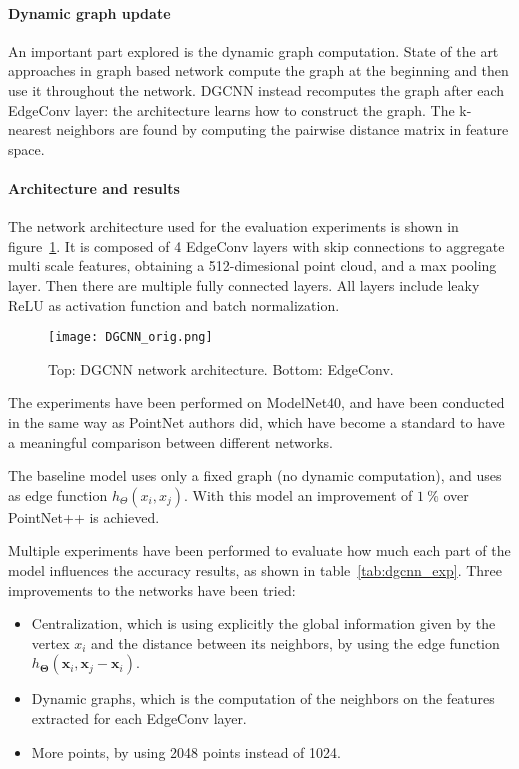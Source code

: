 \paragraph{Dynamic graph update}
An important part explored is the dynamic graph computation.
State of the art approaches in graph based network compute the graph at the beginning and then use it throughout the network. DGCNN instead recomputes the graph after each EdgeConv layer: the architecture learns how to construct the graph.
The k-nearest neighbors are found by computing the pairwise distance matrix in feature space.

\paragraph{Architecture and results}

The network architecture used for the evaluation experiments is shown in figure~\ref{fig:DGCNN}. It is composed of 4 EdgeConv layers with skip connections to aggregate multi scale features, obtaining a 512-dimesional point cloud, and a max pooling layer. Then there are multiple fully connected layers. All layers include leaky ReLU as activation function and batch normalization.

\begin{figure}[ht]
    \centering
    \texttt{[image: DGCNN\_orig.png]}
    \caption{Top: DGCNN network architecture. Bottom: EdgeConv.~\cite{Wang2019}}
    \label{fig:DGCNN}
\end{figure}

The experiments have been performed on ModelNet40, and have been conducted in the same way as PointNet authors did, which have become a standard to have a meaningful comparison between different networks.

The baseline model uses only a fixed graph (no dynamic computation), and uses as edge function $ h_{\Theta}(x_i, x_j)$. With this model an improvement of $\SI{1}{\percent}$ over PointNet++ is achieved.

Multiple experiments have been performed to evaluate how much each part of the model influences the accuracy results, as shown in table~\ref{tab:dgcnn_exp}.
Three improvements to the networks have been tried:

\begin{itemize}
    \item Centralization, which is using explicitly the global information given by the vertex $x_i$ and the distance between its neighbors, by using the edge function ${h}_{\mathbf{\Theta}}\left(\mathbf{x}_{i}, \mathbf{x}_{j}-\mathbf{x}_{i}\right)$.
    \item Dynamic graphs, which is the computation of the neighbors on the features extracted for each EdgeConv layer.
    \item More points, by using 2048 points instead of 1024.
\end{itemize}

